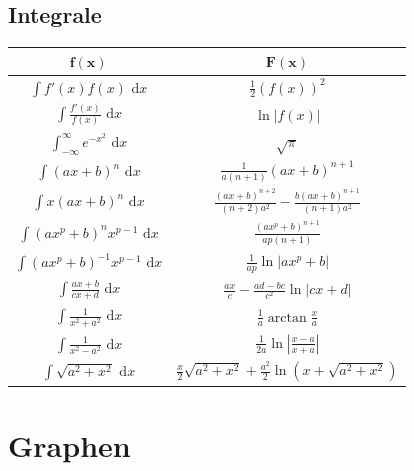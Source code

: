 \documentclass[a4paper,8pt]{extarticle}
\def\dx{\text{ d}x}
\begin{document}
\subsection{Integrale}
\begin{center}
 \begin{tabular}{|c|c|}
  \hline
  $\mathbf{f(x)}$ & $\mathbf{F(x)}$ \\
  \hline
  \hline
  $\int f'(x) f(x) \dx$ & $\frac{1}{2}(f(x))^2$ \\
  \hline
  $\int \frac{f'(x)}{f(x)} \dx$ & $\ln|f(x)|$ \\
  \hline
  $\int_{-\infty}^\infty e^{-x^2} \dx$ & $\sqrt{\pi}$ \\
  \hline
  $\int (ax+b)^n \dx$ & $\frac{1}{a(n+1)}(ax+b)^{n+1}$ \\
  \hline
  $\int x(ax+b)^n \dx$ & $\frac{(ax+b)^{n+2}}{(n+2)a^2} - \frac{b(ax+b)^{n+1}}{(n+1)a^2}$ \\
  \hline
  $\int (ax^p+b)^n x^{p-1} \dx$ & $\frac{(ax^p+b)^{n+1}}{ap(n+1)}$ \\
  \hline
  $\int (ax^p + b)^{-1} x^{p-1} \dx$ & $\frac{1}{ap} \ln |ax^p + b|$ \\
  \hline
  $\int \frac{ax+b}{cx+d} \dx$ & $\frac{ax}{c} - \frac{ad-bc}{c^2} \ln |cx +d|$ \\
  \hline
  $\int \frac{1}{x^2+a^2} \dx$ & $\frac{1}{a} \arctan \frac{x}{a}$ \\
  \hline
  $\int \frac{1}{x^2 - a^2} \dx$ & $\frac{1}{2a} \ln\left| \frac{x-a}{x+a} \right|$ \\
  \hline
  $\int \sqrt{a^2+x^2} \dx $ & $\frac{x}{2}\sqrt{a^2 + x^2} + \frac{a^2}{2}\ln(x+\sqrt{a^2+x^2})$ \\
  \hline
 \end{tabular}
\end{center}
\section{Graphen}
\end{document}
